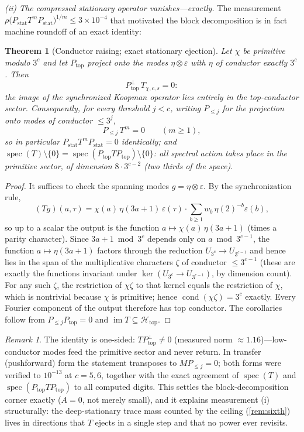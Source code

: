 \documentclass[11pt]{article}
\theoremstyle{plain}
\newtheorem{theorem}{Theorem}
\theoremstyle{definition}
\theoremstyle{remark}
\newtheorem*{remark}{Remark}
\begin{document}
\emph{(ii) The compressed stationary operator vanishes---exactly.} The
measurement $\rho\bigl(P_{\mathrm{stat}}T^mP_{\mathrm{stat}}\bigr)^{1/m}
\le3\times10^{-4}$ that motivated the block decomposition is in fact machine
roundoff of an exact identity:

\begin{theorem}[Conductor raising; exact stationary ejection]\label{thm:eject}
Let $\chi$ be primitive modulo $3^c$ and let $P_{\mathrm{top}}$ project onto
the modes $\eta\otimes\varepsilon$ with $\eta$ of conductor exactly $3^c$.
Then
\[
P_{\mathrm{top}}^{\perp}\,T_{\chi,c,s}=0:
\]
the image of the synchronized Koopman operator lies entirely in the
top-conductor sector. Consequently, for every threshold $j<c$, writing
$P_{\le j}$ for the projection onto modes of conductor $\le3^j$,
\[
P_{\le j}\,T^m=0\qquad(m\ge1),
\]
so in particular $P_{\mathrm{stat}}T^mP_{\mathrm{stat}}=0$ identically; and
$\operatorname{spec}(T)\setminus\{0\}
=\operatorname{spec}(P_{\mathrm{top}}TP_{\mathrm{top}})\setminus\{0\}$: all
spectral action takes place in the primitive sector, of dimension
$8\cdot3^{c-2}$ (two thirds of the space).
\end{theorem}

\begin{proof}
It suffices to check the spanning modes $g=\eta\otimes\varepsilon$. By the
synchronization rule,
\[
(Tg)(a,\tau)
=\chi(a)\,\eta(3a+1)\,\varepsilon(\tau)\cdot
\sum_{b\ge1}w_b\,\eta(2)^{-b}\varepsilon(b),
\]
so up to a scalar the output is the function $a\mapsto\chi(a)\,\eta(3a+1)$
(times a parity character). Since $3a+1\bmod3^c$ depends only on
$a\bmod3^{c-1}$, the function $a\mapsto\eta(3a+1)$ factors through the
reduction $U_{3^c}\to U_{3^{c-1}}$ and hence lies in the span of the
multiplicative characters $\zeta$ of conductor $\le3^{c-1}$ (these are exactly
the functions invariant under $\ker(U_{3^c}\to U_{3^{c-1}})$, by dimension
count). For any such $\zeta$, the restriction of $\chi\zeta$ to that kernel
equals the restriction of $\chi$, which is nontrivial because $\chi$ is
primitive; hence $\operatorname{cond}(\chi\zeta)=3^c$ exactly. Every Fourier
component of the output therefore has top conductor. The corollaries follow
from $P_{\le j}P_{\mathrm{top}}=0$ and
$\operatorname{im}T\subseteq\mathcal H_{\mathrm{top}}$.
\end{proof}

\begin{remark}
The identity is one-sided: $TP_{\mathrm{top}}^{\perp}\ne0$ (measured norm
$\approx1.16$)---low-conductor modes feed the primitive sector and never
return. In transfer (pushforward) form the statement transposes to
$MP_{\le j}=0$; both forms were verified to $10^{-13}$ at $c=5,6$, together
with the exact agreement of $\operatorname{spec}(T)$ and
$\operatorname{spec}(P_{\mathrm{top}}TP_{\mathrm{top}})$ to all computed
digits. This settles the block-decomposition corner exactly ($A=0$, not
merely small), and it explains measurement (i) structurally: the
deep-stationary trace mass counted by the ceiling (\cref{rem:sixth}) lives in
directions that $T$ ejects in a single step and that no power ever revisits.
\end{remark}
\end{document}
